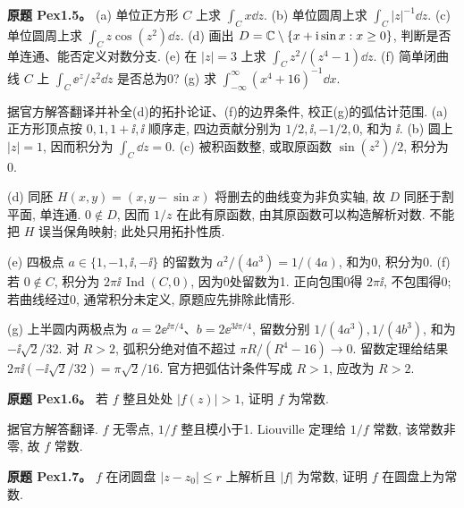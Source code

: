 \begin{exercise}\label{ass:pex1-5}
\textbf{原题 Pex1.5。} (a) 单位正方形 $C$ 上求 $\int_C x\dd z$. (b) 单位圆周上求 $\int_C |z|^{-1}\dd z$. (c) 单位圆周上求 $\int_C z\cos(z^2)\dd z$. (d) 画出 $D=\mathbb C\setminus\{x+\mathrm i\sin x:x\ge0\}$, 判断是否单连通、能否定义对数分支. (e) 在 $|z|=3$ 上求 $\int_C z^2/(z^4-1)\dd z$. (f) 简单闭曲线 $C$ 上 $\int_C\ee^z/z^2\dd z$ 是否总为0? (g) 求 $\int_{-\infty}^{\infty}(x^4+16)^{-1}\dd x$.
\end{exercise}
\begin{solution}
据官方解答翻译并补全(d)的拓扑论证、(f)的边界条件, 校正(g)的弧估计范围. (a) 正方形顶点按 $0,1,1+\ii,\ii$ 顺序走, 四边贡献分别为 $1/2,\ii,-1/2,0$, 和为 $\ii$. (b) 圆上 $|z|=1$, 因而积分为 $\int_C\dd z=0$. (c) 被积函数整, 或取原函数 $\sin(z^2)/2$, 积分为0.

(d) 同胚 $H(x,y)=(x,y-\sin x)$ 将删去的曲线变为非负实轴, 故 $D$ 同胚于割平面, 单连通. $0\notin D$, 因而 $1/z$ 在此有原函数, 由其原函数可以构造解析对数. 不能把 $H$ 误当保角映射; 此处只用拓扑性质.
\begin{center}\end{center}

(e) 四极点 $a\in\{1,-1,\ii,-\ii\}$ 的留数为 $a^2/(4a^3)=1/(4a)$, 和为0, 积分为0. (f) 若 $0\notin C$, 积分为 $2\pi\ii\,\operatorname{Ind}(C,0)$, 因为0处留数为1. 正向包围0得 $2\pi\ii$, 不包围得0; 若曲线经过0, 通常积分未定义, 原题应先排除此情形.

(g) 上半圆内两极点为 $a=2\ee^{\ii\pi/4}$、$b=2\ee^{3\ii\pi/4}$, 留数分别 $1/(4a^3),1/(4b^3)$, 和为 $-\ii\sqrt2/32$. 对 $R>2$, 弧积分绝对值不超过 $\pi R/(R^4-16)\to0$. 留数定理给结果 $2\pi\ii(-\ii\sqrt2/32)=\pi\sqrt2/16$. 官方把弧估计条件写成 $R>1$, 应改为 $R>2$.
\end{solution}
\begin{exercise}\label{ass:pex1-6}
\textbf{原题 Pex1.6。} 若 $f$ 整且处处 $|f(z)|>1$, 证明 $f$ 为常数.
\end{exercise}
\begin{solution}据官方解答翻译. $f$ 无零点, $1/f$ 整且模小于1. Liouville 定理给 $1/f$ 常数, 该常数非零, 故 $f$ 常数.\end{solution}
\begin{exercise}\label{ass:pex1-7}
\textbf{原题 Pex1.7。} $f$ 在闭圆盘 $|z-z_0|\le r$ 上解析且 $|f|$ 为常数, 证明 $f$ 在圆盘上为常数.
\end{exercise}
